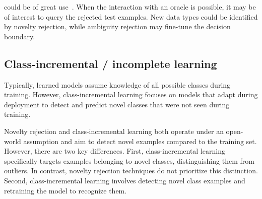 
 could be of great use~\citep{Korycki2019,Puchkin2022,Shekhar2020a}. When the interaction with an oracle is possible, it may be of interest to query the rejected test examples. New data types could be identified by novelty rejection, while ambiguity rejection may fine-tune the decision boundary.



\subsection{Class-incremental / incomplete learning}

Typically, learned models assume knowledge of all possible classes during training. However, class-incremental learning focuses on models that adapt during deployment to detect and predict novel classes that were not seen during training.

Novelty rejection and class-incremental learning both operate under an open-world assumption and aim to detect novel examples compared to the training set. However, there are two key differences. First, class-incremental learning specifically targets examples belonging to novel classes, distinguishing them from outliers. In contrast, novelty rejection techniques do not prioritize this distinction. Second, class-incremental learning involves detecting novel class examples and retraining the model to recognize them. 

